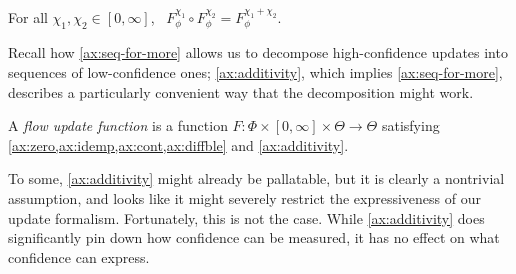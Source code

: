 \begin{CFaxioms}
	\item For all
		$\chi_1, \chi_2 \in [0,\infty]$,~
		$F^{\chi_1}_\phi \circ F^{\chi_2}_\phi = F^{\chi_1 + \chi_2}_\phi$.
		\label{ax:additivity}
\end{CFaxioms}

Recall how \cref{ax:seq-for-more} allows us to decompose high-confidence updates into sequences of low-confidence ones;
\cref{ax:additivity},
which implies \cref{ax:seq-for-more}, describes a particularly convenient
way that the decomposition might work. 

\begin{defn}
	A \emph{flow update function}
	is a function
	$F : \Phi \times[0,\infty] \times \Theta\to \Theta$
	satisfying 
	\cref{ax:zero,ax:idemp,ax:cont,ax:diffble}
	and \cref{ax:additivity}.
\end{defn}

To some,
\cref{ax:additivity} might already be pallatable,
but it is clearly a nontrivial assumption, and looks like it might severely restrict the expressiveness of our update formalism.
Fortunately, this is not the case.
While \cref{ax:additivity} does significantly pin down how confidence 
can be measured, it has no effect on what confidence can express.  


